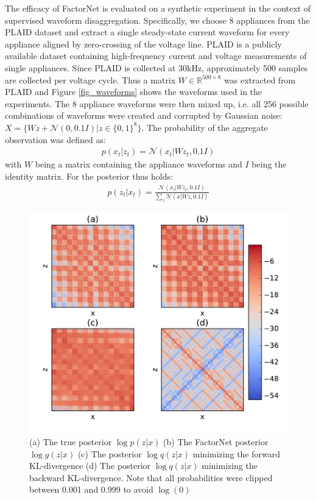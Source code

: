The efficacy of FactorNet is evaluated on a synthetic experiment in the context of supervised waveform disaggregation. Specifically, we choose 8 appliances from the PLAID dataset\cite{gao2014plaid} and extract a single steady-state current waveform for every appliance aligned by zero-crossing of the voltage line. PLAID is a publicly available dataset containing high-frequency current and voltage measurements of single appliances. Since PLAID is collected at 30kHz, approximately 500 samples are collected per voltage cycle. Thus a matrix $W\in \mathbb{R}^{500\times8}$ was extracted from PLAID and Figure \ref{fig_waveforms} shows the waveforms used in the experiments. The 8 appliance waveforms were then mixed up, i.e. all 256 possible combinations of waveforms were created and corrupted by Gaussian noise: $X = \{Wz + \mathcal{N}(0, 0.1 I) | z \in \{0,1\}^8\}$. The probability of the aggregate observation was defined as:
\begin{align*}
p(x_t|z_t) = \mathcal{N}(x_t | Wz_t, 0.1 I)
\end{align*}
with $W$ being a matrix containing the appliance waveforms and $I$ being the identity matrix.
For the posterior thus holds:
\begin{align*}
p(z_t|x_t) = \frac{\mathcal{N}(x_t | Wz_t, 0.1 I)}{\sum_z \mathcal{N}(x | Wz, 0.1 I)}
\end{align*}
\begin{figure}
\centering
\includegraphics[width=0.9\linewidth]{factornet/posteriors2.pdf}
\caption[FactorNet: Performance comparison.]{(a) The true posterior $\log p(z|x)$ (b) The FactorNet posterior $\log g(z|x)$ (c) The posterior $\log q(z|x)$ minimizing the forward KL-divergence (d) The posterior $\log q(z|x)$ minimizing the backward KL-divergence. Note that all probabilities were clipped between 0.001 and 0.999 to avoid $\log(0)$}
\label{fig_posteriors}
\end{figure}

